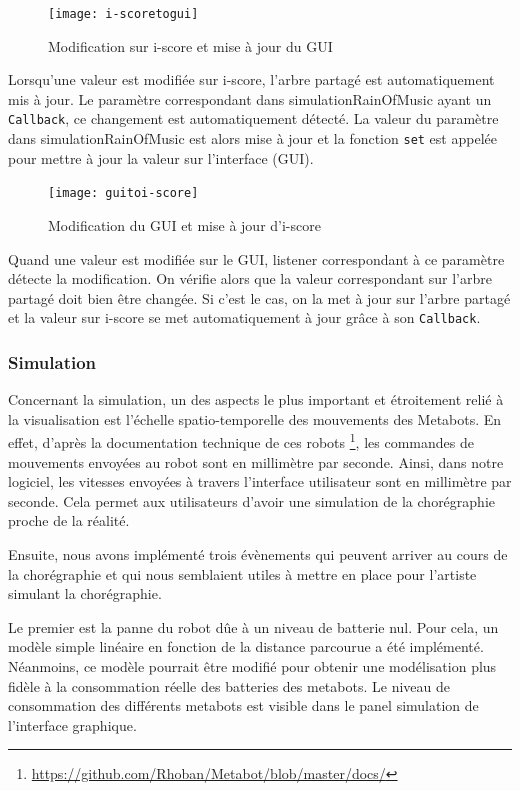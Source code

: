 \begin{figure}[H]
\begin{center}
\texttt{[image: i-scoretogui]}
\caption{Modification sur i-score et mise à jour du GUI}
\label{diag1}
\end{center}
\end{figure}

Lorsqu'une valeur est modifiée sur i-score, l'arbre partagé est automatiquement mis à jour. Le paramètre correspondant dans simulationRainOfMusic ayant un \verb|Callback|, ce changement est automatiquement détecté. La valeur du paramètre dans simulationRainOfMusic est alors mise à jour et la fonction \verb|set| est appelée pour mettre à jour la valeur sur l'interface (GUI).

\begin{figure}[H]
\begin{center}
\texttt{[image: guitoi-score]}
\caption{Modification du GUI et mise à jour d'i-score}
\label{diag2}
\end{center}
\end{figure}

Quand une valeur est modifiée sur le GUI, listener correspondant à ce paramètre détecte la modification. On vérifie alors que la valeur correspondant sur l'arbre partagé doit bien être changée. Si c'est le cas, on la met à jour sur l'arbre partagé et la valeur sur i-score se met automatiquement à jour grâce à son \verb|Callback|. 

\subsubsection{Simulation}

Concernant la simulation, un des aspects le plus important et étroitement relié à la visualisation est l'échelle spatio-temporelle des mouvements des Metabots. En effet, d'après la documentation technique de ces robots \footnote{\url{https://github.com/Rhoban/Metabot/blob/master/docs/}}, les commandes de mouvements envoyées au robot sont en millimètre par seconde. Ainsi, dans notre logiciel, les vitesses envoyées à travers l'interface utilisateur sont en millimètre par seconde. Cela permet aux utilisateurs d'avoir une simulation de la chorégraphie proche de la réalité.

Ensuite, nous avons implémenté trois évènements qui peuvent arriver au cours de la chorégraphie et qui nous semblaient utiles à mettre en place pour l'artiste simulant la chorégraphie. 

Le premier est la panne du robot dûe à un niveau de batterie nul. Pour cela, un modèle simple linéaire en fonction de la distance parcourue a été implémenté. Néanmoins, ce modèle pourrait être modifié pour obtenir une modélisation plus fidèle à la consommation réelle des batteries des metabots. Le niveau de consommation des différents metabots est visible dans le panel simulation de l'interface graphique. 

